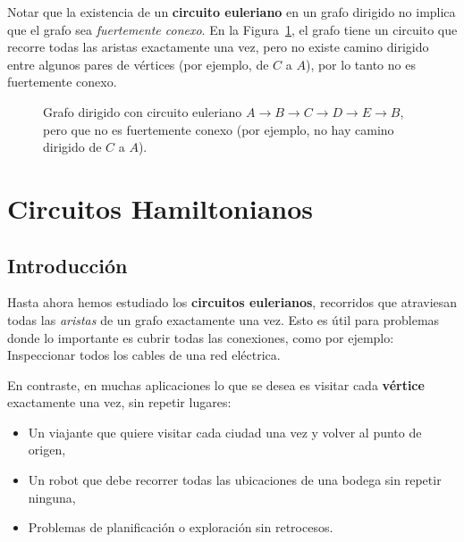 \medskip 
Notar que la existencia de un \textbf{circuito euleriano} en un grafo dirigido no implica que el grafo sea \emph{fuertemente conexo}.
En la Figura~\ref{fig:euleriano-no-fuerte}, el grafo tiene un circuito que recorre todas las aristas exactamente una vez, pero no existe camino dirigido entre algunos pares de vértices (por ejemplo, de \(C\) a \(A\)), por lo tanto no es fuertemente conexo.


\begin{figure}[ht]
\centering
{}
\caption{Grafo dirigido con circuito euleriano \(A \rightarrow B \rightarrow C \rightarrow D \rightarrow E \rightarrow B \), pero que no es fuertemente conexo (por ejemplo, no hay camino dirigido de \(C\) a \(A\)).}
\label{fig:euleriano-no-fuerte}
\end{figure}




\section{Circuitos Hamiltonianos}

\subsection{Introducción}

Hasta ahora hemos estudiado los \textbf{circuitos eulerianos}, recorridos que atraviesan todas las \emph{aristas} de un grafo exactamente una vez. Esto es útil para problemas donde lo importante es cubrir todas las conexiones, como por ejemplo: Inspeccionar todos los cables de una red eléctrica.



En contraste, en muchas aplicaciones lo que se desea es visitar cada \textbf{vértice} exactamente una vez, sin repetir lugares:

\begin{itemize}
  \item Un viajante que quiere visitar cada ciudad una vez y volver al punto de origen,
  \item Un robot que debe recorrer todas las ubicaciones de una bodega sin repetir ninguna,
  \item Problemas de planificación o exploración sin retrocesos.
\end{itemize}


